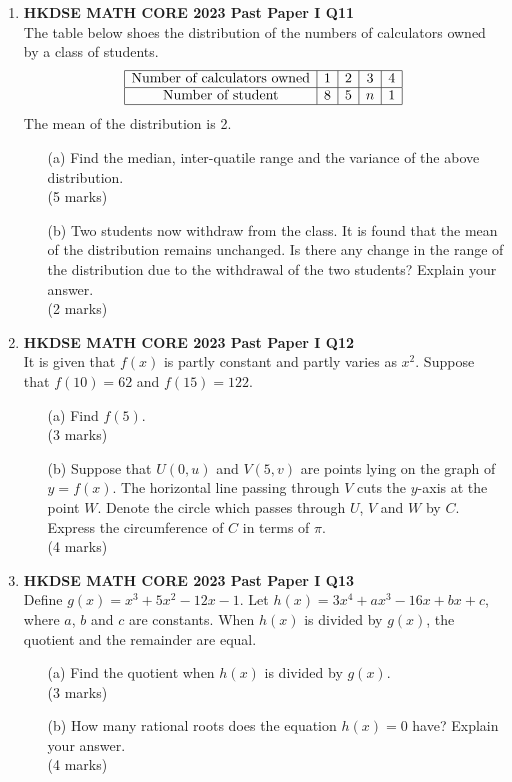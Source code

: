 \documentclass[12pt]{article}
\begin{document}
\begin{enumerate}
	\item \textbf{HKDSE MATH CORE 2023 Past Paper I Q11}\\
	The table below shoes the distribution of the numbers of calculators owned by a class of students.
	$$\begin{array}{|c|c|c|c|c|}
		\hline
		\text{Number of calculators owned} & 1 & 2 & 3 & 4 \\
		\hline
		\text{Number of student} & 8 & 5 & n & 1 \\
		\hline
	\end{array}$$
	The mean of the distribution is 2.
	\begin{enumerate}
		\item[(a)] Find the median, inter-quatile range and the variance of the above distribution. \\(5 marks)
		\item[(b)] Two students now withdraw from the class. It is found that the mean of the distribution remains unchanged. Is there any change in the range of the distribution due to the withdrawal of the two students? Explain your answer. \\(2 marks)
	\end{enumerate}

	\item \textbf{HKDSE MATH CORE 2023 Past Paper I Q12}\\
	It is given that $f(x)$ is partly constant and partly varies as $x^2$. Suppose that $f(10) = 62$ and $f(15) = 122$.
	\begin{enumerate}
		\item[(a)] Find $f(5)$. \\(3 marks)
		\item[(b)] Suppose that $U(0, u)$ and $V(5,v)$ are points lying on the graph of $y = f(x)$. The horizontal line passing through $V$ cuts the $y$-axis at the point $W$. Denote the circle which passes through $U$, $V$ and $W$ by $C$. Express the circumference of $C$ in terms of $\pi$. \\(4 marks)
	\end{enumerate}

	\item \textbf{HKDSE MATH CORE 2023 Past Paper I Q13}\\
	Define $g(x) = x^3 + 5x^2 - 12x - 1$. Let $h(x) = 3x^4 + ax^3 - 16x + bx + c$, where $a$, $b$ and $c$ are constants. When $h(x)$ is divided by $g(x)$, the quotient and the remainder are equal.
	\begin{enumerate}
		\item[(a)] Find the quotient when $h(x)$ is divided by $g(x)$. \\(3 marks)
		\item[(b)] How many rational roots does the equation $h(x) = 0$ have? Explain your answer. \\(4 marks)
	\end{enumerate}


\end{enumerate}
\end{document}

